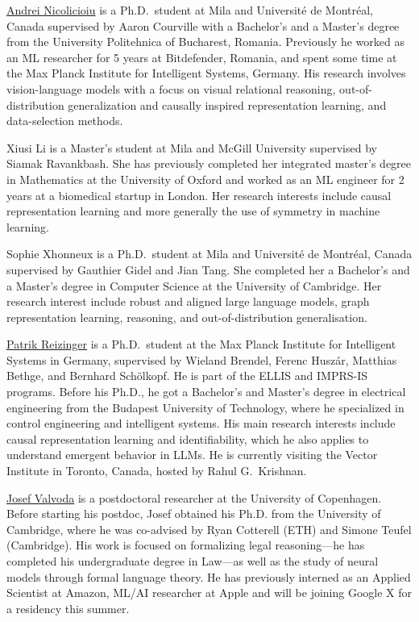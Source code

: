 \documentclass{article}
\begin{document}
\href{https://andreinicolicioiu.github.io/}{Andrei Nicolicioiu}
is a Ph.D.\ student at Mila and Universit\'{e} de Montr\'{e}al, Canada supervised by Aaron Courville with a Bachelor’s and a Master’s degree from the University Politehnica of Bucharest, Romania. Previously he worked as an ML researcher for 5 years at Bitdefender, Romania, and spent some time at the Max Planck Institute for Intelligent Systems, Germany. His research involves vision-language models with a focus on visual relational reasoning, out-of-distribution generalization and causally inspired representation learning, and data-selection methods.

Xiusi Li is a Master's student at Mila and McGill University supervised by Siamak Ravankbash. She has previously completed her integrated master's degree in Mathematics at the University of Oxford and worked as an ML engineer for 2 years at a biomedical startup in London. Her research interests include causal representation learning and more generally the use of symmetry in machine learning.

Sophie Xhonneux is a Ph.D.\ student at Mila and Universit\'{e} de Montr\'{e}al, Canada supervised by Gauthier Gidel and Jian Tang. She completed her a Bachelor's and a Master's degree in Computer Science at the University of Cambridge. Her research interest include robust and aligned large language models, graph representation learning, reasoning, and out-of-distribution generalisation.


\href{https://rpatrik96.github.io/}{Patrik Reizinger} is a Ph.D.\ student at the Max Planck Institute for Intelligent Systems in Germany, supervised by Wieland Brendel, Ferenc Huszár, Matthias Bethge, and Bernhard Schölkopf. He is part of the ELLIS and IMPRS-IS programs. Before his Ph.D., he got a Bachelor's and Master's degree in electrical engineering from the Budapest University of Technology, where he specialized in control engineering and intelligent systems. His main research interests include causal representation learning and identifiability, which he also applies to understand emergent behavior in LLMs. He is currently visiting the Vector Institute in Toronto, Canada, hosted by Rahul G.~Krishnan.

\href{https://valvoda.github.io/}{Josef Valvoda} is a postdoctoral researcher at the University of Copenhagen. 
Before starting his postdoc, Josef obtained his Ph.D. from the University of Cambridge, where he was co-advised by Ryan Cotterell (ETH) and Simone Teufel (Cambridge).
His work is focused on formalizing legal reasoning---he has completed his undergraduate degree in Law---as well as the study of neural models through formal language theory.
He has previously interned as an Applied Scientist at Amazon, ML/AI researcher at Apple and will be joining Google X for a residency this summer.
\end{document}
